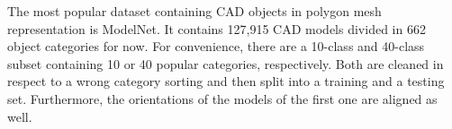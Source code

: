 The most popular dataset containing CAD objects in polygon mesh representation is ModelNet\cite{conf/cvpr/WuSKYZTX15}.
It contains 127,915 CAD models divided in 662 object categories for now.
For convenience, there are a 10-class and 40-class subset containing 10 or 40 popular categories, respectively.
Both are cleaned in respect to a wrong category sorting and then split into a training and a testing set.
Furthermore, the orientations of the models of the first one are aligned as well.